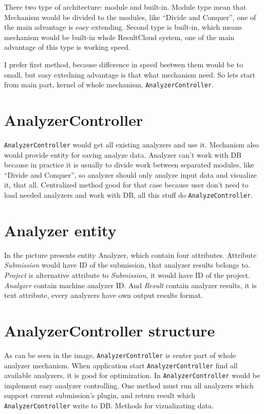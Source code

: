 There two type of architecture: module and built-in. Module type mean that Mechanism would be divided to the modules, like “Divide and Conquer”, one of the main advantage is easy extending. Second type is built-in, which means mechanism would be built-in whole ResultCloud system, one of the main advantage of this type is working speed.

I prefer first method, because difference in speed beetwen them would be to small, but easy extedning advantage is that what mechanism need. So lets start from main part, kernel of whole mechanism, \texttt{AnalyzerController}. 

\section{AnalyzerController}

\texttt{AnalyzerController} would get all existing analyzers and use it. Mechanism also would provide entity for saving analyze data. Analyzer can't work with DB because in practice it is usually to divide work between separated modules, like “Divide and Conquer”, so analyzer should only analyze input data and visualize it, that all. Centralized method good for that case because user don't need to load needed analyzers and work with DB, all this stuff do \texttt{AnalyzeController}.

\section{Analyzer entity}

In the picture presents entity Analyzer, which contain four attributes. Attribute \emph{Submission} would have ID of the submission, that analyzer results belongs to. \emph{Project} is alternative attribute to \emph{Submission}, it would have ID of the project. \emph{Analyzer} contain machine analyzer ID. And \emph{Result} contain analyzer results, it is text attribute, every analyzers have own output results format.

\section{AnalyzerController structure}

As can be seen in the image, \texttt{AnalyzerController} is center part of whole analyzer mechanism. When application start \texttt{AnalyzerController} find all available analyzers, it is good for optimization. In \texttt{AnalyzerController} would be implement easy analyzer controlling. One method must run all analyzers which support current submission's plugin, and return result which \texttt{AnalyzerController} write to DB. Methods for vizualizating data.

